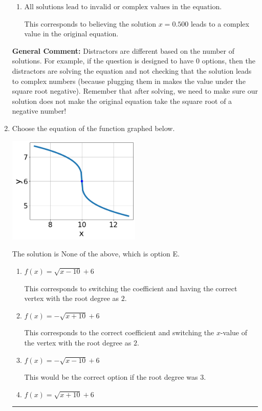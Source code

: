 \documentclass{extbook}[14pt]
\newcommand{\litem}[1]{\item #1

\rule{\textwidth}{0.4pt}}
\begin{document}
\begin{enumerate}
{\begin{enumerate}[label=\Alph*.]
* $x = 0.500$, which is the correct option.
\item \( \text{All solutions lead to invalid or complex values in the equation.} \)

This corresponds to believing the solution $x = 0.500$ leads to a complex value in the original equation.
\end{enumerate}

\textbf{General Comment:} Distractors are different based on the number of solutions. For example, if the question is designed to have 0 options, then the distractors are solving the equation and not checking that the solution leads to complex numbers (because plugging them in makes the value under the square root negative). Remember that after solving, we need to make sure our solution does not make the original equation take the square root of a negative number!
}
\litem{
Choose the equation of the function graphed below.

\begin{center}
    \includegraphics[width=0.5\textwidth]{../Figures/radicalGraphToEquationCopyB.png}
\end{center}


The solution is \( \text{None of the above} \), which is option E.\begin{enumerate}[label=\Alph*.]
\item \( f(x) = \sqrt{x - 10} + 6 \)

This corresponds to switching the coefficient and having the correct vertex with the root degree as $2$.
\item \( f(x) = - \sqrt{x + 10} + 6 \)

This corresponds to the correct coefficient and switching the $x$-value of the vertex with the root degree as $2$.
\item \( f(x) = - \sqrt{x - 10} + 6 \)

This would be the correct option if the root degree was $3$.
\item \( f(x) = \sqrt{x + 10} + 6 \)


\end{enumerate}}
\end{enumerate}
\end{document}
